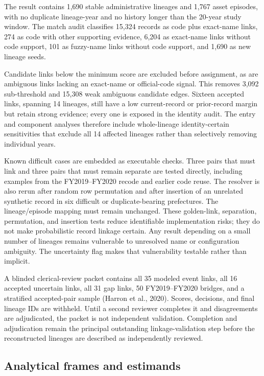 \documentclass[12pt,letterpaper]{article}
\begin{document}
The result contains 1,690 stable administrative lineages and 1,767 asset
episodes, with no duplicate lineage-year and no history longer than the 20-year
study window. The match audit classifies 15,324 records as code plus exact-name
links, 274 as code with other supporting evidence, 6,204 as exact-name links
without code support, 101 as fuzzy-name links without code support, and 1,690 as
new lineage seeds.

Candidate links below the minimum score are excluded before assignment, as are
ambiguous links lacking an exact-name or official-code signal. This removes
3,092 sub-threshold and 15,308 weak ambiguous candidate edges. Sixteen accepted
links, spanning 14 lineages, still have a low current-record or prior-record
margin but retain strong evidence; every one is exposed in the identity audit.
The entry and component analyses therefore include whole-lineage
identity-certain sensitivities that exclude all 14 affected lineages rather
than selectively removing individual years.

Known difficult cases are embedded as executable checks. Three pairs that must
link and three pairs that must remain separate are tested directly, including
examples from the FY2019--FY2020 recode and earlier code reuse. The resolver is
also rerun after random row permutation and after insertion of an unrelated
synthetic record in six difficult or duplicate-bearing prefectures. The
lineage/episode mapping must remain unchanged. These golden-link, separation,
permutation, and insertion tests reduce identifiable implementation risks; they
do not make probabilistic record linkage certain. Any result depending on a
small number of lineages remains vulnerable to unresolved name or configuration
ambiguity. The uncertainty flag makes that vulnerability testable rather than
implicit.

A blinded clerical-review packet contains all 35 modeled event links, all 16
accepted uncertain links, all 31 gap links, 50 FY2019--FY2020 bridges, and a
stratified accepted-pair sample (Harron et al., 2020). Scores, decisions, and
final lineage IDs are withheld. Until a second reviewer completes it and
disagreements are adjudicated, the packet is not independent validation.
Completion and adjudication remain the principal outstanding
linkage-validation step before the reconstructed lineages are described as
independently reviewed.

\subsection{Analytical frames and estimands}
\end{document}
